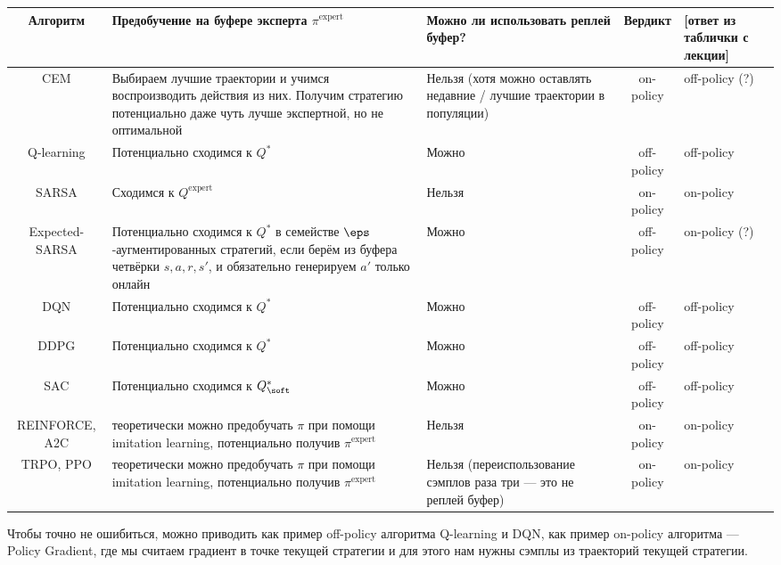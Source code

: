 \vspace{0.2cm}
\begin{center}
\begin{tabular}{cm{6cm}m{4cm}cm{2cm}}
\toprule
    \textbf{Алгоритм} & \textbf{Предобучение на буфере эксперта $\pi^{\operatorname{expert}}$} & \textbf{Можно ли использовать реплей буфер?} & \textbf{Вердикт} & \textbf{[ответ из таблички с лекции]}  \\
\midrule
    CEM & Выбираем лучшие траектории и учимся воспроизводить действия из них. Получим стратегию потенциально даже чуть лучше экспертной, но не оптимальной & Нельзя (хотя можно оставлять недавние / лучшие траектории в популяции) & on-policy & off-policy (?) \\
    \hdashline
    Q-learning & Потенциально сходимся к $Q^*$ & Можно & off-policy & off-policy \\
    SARSA & Сходимся к $Q^{\operatorname{expert}}$ & Нельзя & on-policy & on-policy \\
    Expected-SARSA & Потенциально сходимся к $Q^*$ в семействе $\eps$-аугментированных стратегий, если берём из буфера четвёрки $s, a, r, s'$, и обязательно генерируем $a'$ только онлайн & Можно & off-policy & on-policy (?) \\
    \hdashline
    DQN & Потенциально сходимся к $Q^*$ & Можно & off-policy & off-policy \\
    DDPG & Потенциально сходимся к $Q^*$ & Можно & off-policy & off-policy \\
    SAC & Потенциально сходимся к $Q^*_{\soft}$ & Можно & off-policy & off-policy \\
    \hdashline
    REINFORCE, A2C & теоретически можно предобучать $\pi$ при помощи imitation learning, потенциально получив $\pi^{\operatorname{expert}}$ & Нельзя & on-policy & on-policy \\
    TRPO, PPO & теоретически можно предобучать $\pi$ при помощи imitation learning, потенциально получив $\pi^{\operatorname{expert}}$ & Нельзя (переиспользование сэмплов раза три --- это не реплей буфер) & on-policy & on-policy \\
\bottomrule
\end{tabular}
\end{center}
\vspace{0.2cm}

Чтобы точно не ошибиться, можно приводить как пример off-policy алгоритма Q-learning и DQN, как пример on-policy алгоритма --- Policy Gradient, где мы считаем градиент в точке текущей стратегии и для этого нам нужны сэмплы из траекторий текущей стратегии.

